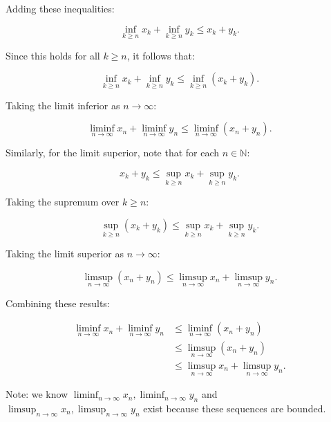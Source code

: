 \documentclass[12pt]{article}
\newcommand{\limsupn}[1]{\displaystyle\limsup_{n\rightarrow \infty}#1}
\newcommand{\liminfn}[1]{\displaystyle\liminf_{n\rightarrow \infty}#1}
\begin{document}
\begin{enumerate}
\begin{enumerate}
                    Adding these inequalities:

                    \[
                        \inf_{k \geq n} x_k + \inf_{k \geq n} y_k \leq x_k + y_k.
                    \]

                    Since this holds for all \( k \geq n \), it follows that:

                    \[
                        \inf_{k \geq n} x_k + \inf_{k \geq n} y_k \leq \inf_{k \geq n} (x_k + y_k).
                    \]

                    Taking the limit inferior as \( n \to \infty \):

                    \[
                        \liminf_{n \rightarrow \infty} x_n + \liminf_{n \rightarrow \infty} y_n \leq \liminf_{n \rightarrow \infty} (x_n + y_n).
                    \]

                    Similarly, for the limit superior, note that for each \( n \in \mathbb{N} \):

                    \[
                        x_k + y_k \leq \sup_{k \geq n} x_k + \sup_{k \geq n} y_k.
                    \]

                    Taking the supremum over \( k \geq n \):

                    \[
                        \sup_{k \geq n} (x_k + y_k) \leq \sup_{k \geq n} x_k + \sup_{k \geq n} y_k.
                    \]

                    Taking the limit superior as \( n \to \infty \):

                    \[
                        \limsup_{n \rightarrow \infty} (x_n + y_n) \leq \limsup_{n \rightarrow \infty} x_n + \limsup_{n \rightarrow \infty} y_n.
                    \]

                    Combining these results:

                    \begin{align*}
                        \liminfn{x_{n}} + \liminfn{y_{n}} & \leq \liminfn{(x_{n} + y_{n})}          \\
                                                          & \leq \limsupn{(x_{n} + y_{n})}          \\
                                                          & \leq \limsupn{x_{n}} + \limsupn{y_{n}}.
                    \end{align*}

                    Note: we know \(\liminfn{x_{n}}, \liminfn{y_{n}}\) and \(\limsupn{x_{n}}, \limsupn{y_{n}}\) exist because these sequences are bounded.


\end{enumerate}
\end{enumerate}
\end{document}
